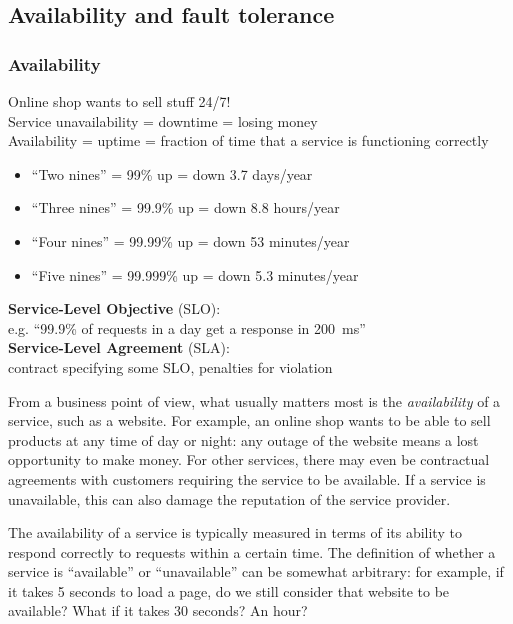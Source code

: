 \subsection{Availability and fault tolerance}\label{sec:availability}

\begin{frame}
    \label{s:availability}
    \frametitle{Availability}
    Online shop wants to sell stuff 24/7! \\
    Service unavailability = downtime = losing money \\[1em]
    Availability = uptime = fraction of time that a service is functioning correctly
    \begin{itemize}
        \item ``Two nines'' = 99\% up = down 3.7 days/year
        \item ``Three nines'' = 99.9\% up = down 8.8 hours/year
        \item ``Four nines'' = 99.99\% up = down 53 minutes/year
        \item ``Five nines'' = 99.999\% up = down 5.3 minutes/year\\[1.5em]
    \end{itemize}\pause
    \textbf{Service-Level Objective} (SLO):\\ e.g. ``99.9\% of requests in a day get a response in 200~ms''\\[1em]
    \textbf{Service-Level Agreement} (SLA):\\ contract specifying some SLO, penalties for violation
\end{frame}
\label{l:availability}

From a business point of view, what usually matters most is the \emph{availability} of a service, such as a website.
For example, an online shop wants to be able to sell products at any time of day or night: any outage of the website means a lost opportunity to make money.
For other services, there may even be contractual agreements with customers requiring the service to be available.
If a service is unavailable, this can also damage the reputation of the service provider.

The availability of a service is typically measured in terms of its ability to respond correctly to requests within a certain time.
The definition of whether a service is ``available'' or ``unavailable'' can be somewhat arbitrary: for example, if it takes 5 seconds to load a page, do we still consider that website to be available?
What if it takes 30 seconds?
An hour?

